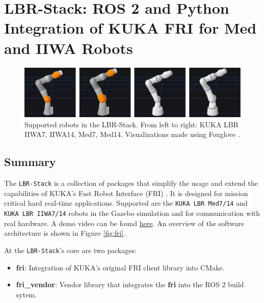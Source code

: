 \chapter{LBR-Stack: ROS 2 and Python Integration of KUKA FRI for Med and
IIWA Robots}

\begin{figure}
\centering
\includegraphics[width=\textwidth]{appendix_1/img/joss_figure.png}
\caption[Supported robots in the LBR-Stack. From left to right: KUKA LBR
IIWA7, IIWA14, Med7, Med14. Visualizations made using Foxglove
.]{Supported robots in the LBR-Stack. From left to right: KUKA LBR
IIWA7, IIWA14, Med7, Med14. Visualizations made using Foxglove
\footnotemark{}.}
\end{figure}

\hypertarget{summary}{%
\section{Summary}\label{summary}}
The \texttt{LBR-Stack} is a collection of packages that simplify the
usage and extend the capabilities of KUKA's Fast Robot Interface (FRI)
\cite{ref-fri}. It is designed
for mission critical hard real-time applications. Supported are the
\texttt{KUKA\ LBR\ Med7/14} and \texttt{KUKA\ LBR\ IIWA7/14} robots in
the Gazebo simulation \cite{ref-gazebo} and for communication with real hardware. A demo video can be
found
\href{https://www.linkedin.com/posts/mhubii_robotics-opensource-ros2-activity-7009974676017848320-S3U5/?utm_source=share\&utm_medium=member_desktop}{here}.
An overview of the software architecture is shown in Figure
\ref{fig:fri}.

At the \texttt{LBR-Stack}'s core are two packages:

\begin{itemize}
\item
  \textbf{fri}: Integration of KUKA's original FRI client library into
  CMake.
\item
  \textbf{fri\_vendor}: Vendor library that integrates the \textbf{fri}
  into the ROS 2 build sytem.
\end{itemize}

